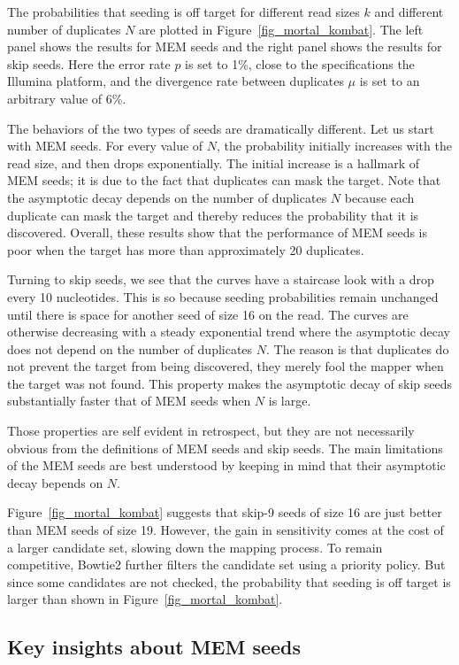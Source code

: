 \documentclass{article}
\begin{document}
The probabilities that seeding is off target for different read sizes $k$
and different number of duplicates $N$ are plotted in
Figure~\ref{fig_mortal_kombat}. The left panel shows the results for MEM
seeds and the right panel shows the results for skip seeds. Here the error
rate $p$ is set to 1\%, close to the specifications the Illumina platform,
and the divergence rate between duplicates $\mu$ is set to an arbitrary
value of 6\%.

The behaviors of the two types of seeds are dramatically different. Let us
start with MEM seeds. For every value of $N$, the probability initially
increases with the read size, and then drops exponentially. The initial
increase is a hallmark of MEM seeds; it is due to the fact that duplicates
can mask the target. Note that the asymptotic decay depends on the number
of duplicates $N$ because each duplicate can mask the target and thereby
reduces the probability that it is discovered. Overall, these results show
that the performance of MEM seeds is poor when the target has more than
approximately 20 duplicates.

Turning to skip seeds, we see that the curves have a staircase look with a
drop every 10 nucleotides. This is so because seeding probabilities remain
unchanged until there is space for another seed of size 16 on the read.
The curves are otherwise decreasing with a steady exponential trend where
the asymptotic decay does not depend on the number of duplicates $N$. The
reason is that duplicates do not prevent the target from being discovered,
they merely fool the mapper when the target was not found. This property
makes the asymptotic decay of skip seeds substantially faster that of MEM
seeds when $N$ is large.

Those properties are self evident in retrospect, but they are not
necessarily obvious from the definitions of MEM seeds and skip seeds.
The main limitations of the MEM seeds are best understood by keeping in
mind that their asymptotic decay bepends on $N$.

Figure~\ref{fig_mortal_kombat} suggests that skip-9 seeds of size 16 are
just better than MEM seeds of size 19. However, the gain in sensitivity
comes at the cost of a larger candidate set, slowing down the mapping
process. To remain competitive, Bowtie2 further filters the candidate set
using a priority policy. But since some candidates are not checked, the
probability that seeding is off target is larger than shown in
Figure~\ref{fig_mortal_kombat}.

\subsection{Key insights about MEM seeds}
\end{document}
